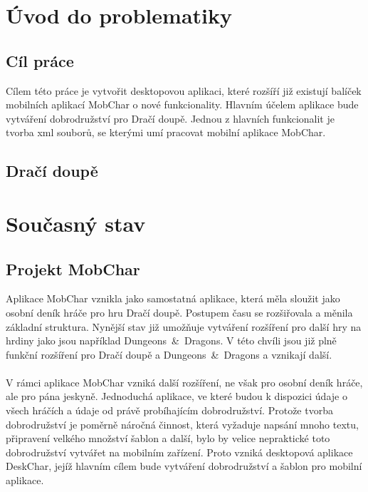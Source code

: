 \documentclass[thesis=B,czech]{resources/FITthesis}[2012/06/26]
\begin{document}
\chapter{Úvod do problematiky}




	\section{Cíl práce}
Cílem této práce je vytvořit desktopovou aplikaci, které rozšíří již existují balíček mobilních aplikací MobChar o nové funkcionality. Hlavním účelem aplikace bude vytváření dobrodružství pro Dračí doupě. Jednou z hlavních funkcionalit je tvorba xml souborů, se kterými umí pracovat mobilní aplikace MobChar.
	\section{Dračí doupě}


\chapter{Současný stav}
	\section{Projekt MobChar}
Aplikace MobChar vznikla jako samostatná aplikace, která měla sloužit jako osobní deník hráče pro hru Dračí doupě. Postupem času se rozšiřovala a měnila základní struktura. Nynější stav již umožňuje vytváření rozšíření pro další hry na hrdiny jako jsou například Dungeons~\&~Dragons. V této chvíli jsou již plně funkční rozšíření pro Dračí doupě a Dungeons~\&~Dragons a vznikají další.\\
\\
V rámci aplikace MobChar vzniká další rozšíření, ne však pro osobní deník hráče, ale pro pána jeskyně. Jednoduchá aplikace, ve které budou k dispozici údaje o všech hráčích a údaje od právě probíhajícím dobrodružství. Protože tvorba dobrodružství je poměrně náročná činnost, která vyžaduje napsání mnoho textu, připravení velkého množství šablon a další, bylo by velice nepraktické toto dobrodružství vytvářet na mobilním zařízení. Proto vzniká desktopová aplikace DeskChar, jejíž hlavním cílem bude vytváření dobrodružství a šablon pro mobilní aplikace.
\end{document}
